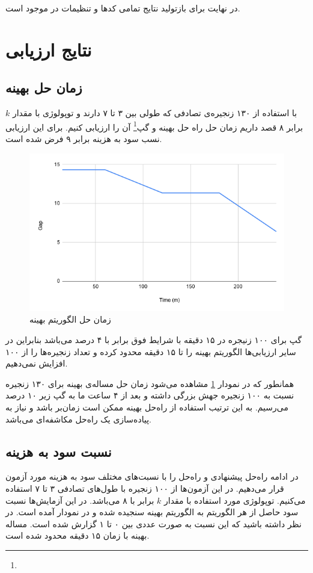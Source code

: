 در نهایت برای بازتولید نتایج تمامی کدها و تنظیمات در \cite{RoadToMSc} موجود است.

\section{نتایج ارزیابی}
\subsection{زمان حل بهینه}
با استفاده از ۱۳۰ زنجیره‌ی تصادفی که طولی بین ۳ تا ۷ دارند
و توپولوژی  با مقدار \(k\) برابر ۸ قصد داریم
زمان حل راه حل بهینه و گپ\footnote{} آن را ارزیابی کنیم. برای این ارزیابی نسب سود به هزینه برابر ۹ فرض شده است.


\begin{figure}[h]
\center\includegraphics[scale=.5]{images/chart-5}
\caption{زمان حل الگوریتم بهینه}
\label{fig.10}
\end{figure}

گپ برای ۱۰۰ زنیجره در ۱۵ دقیقه با شرایط فوق برابر با ۴ درصد می‌باشد بنابراین
در سایر ارزیابی‌ها الگوریتم بهینه را تا ۱۵ دقیقه محدود کرده و تعداد زنجیره‌ها را از ۱۰۰ افزایش نمی‌دهیم.

همانطور که در نمودار \ref{fig.10} مشاهده می‌شود زمان حل مساله‌ی بهینه برای ۱۳۰ زنجیره نسبت به ۱۰۰ زنجیره جهش بزرگی داشته
و بعد از ۴ ساعت ما به گپ زیر ۱۰ درصد می‌رسیم.
به این ترتیب استفاده از راه‌حل بهینه ممکن است زمان‌بر باشد و نیاز به پیاده‌سازی یک راه‌حل مکاشفه‌ای می‌باشد.

\subsection{نسبت سود به هزینه}

در ادامه راه‌حل پیشنهادی و راه‌حل \cite{Bari2015} را با نسبت‌های مختلف سود به هزینه مورد آزمون قرار می‌دهیم. 
در این آزمون‌ها از ۱۰۰ زنجیره با طول‌های تصادفی ۳ تا ۷ استفاده می‌کنیم.
توپولوژی مورد استفاده
با مقدار \(k\)
برابر با ۸
می‌باشد.
در این آزمایش‌ها نسبت سود حاصل از هر الگوریتم به الگوریتم بهینه سنجیده شده و در نمودار آمده است.
در نظر داشته باشید که این نسبت به صورت عددی بین ۰ تا ۱ گزارش شده است.
مساله بهینه با زمان ۱۵ دقیقه محدود شده است.


